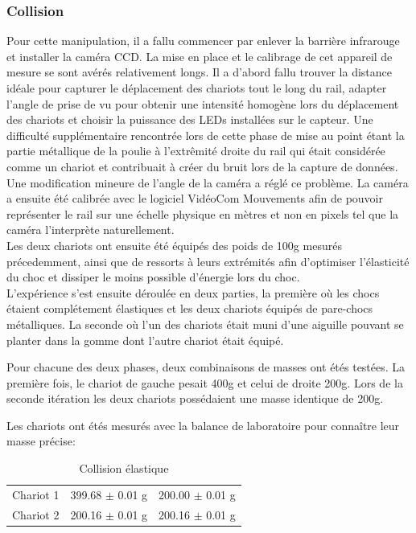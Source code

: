 \subsubsection{Collision}
Pour cette manipulation, il a fallu commencer par enlever la barrière infrarouge et installer la caméra CCD.
La mise en place et le calibrage de cet appareil de mesure se sont avérés relativement longs. Il a d'abord fallu trouver la distance idéale pour capturer le déplacement des chariots tout le long du rail, adapter l'angle de prise de vu pour obtenir une intensité homogène lors du déplacement des chariots et choisir la puissance des LEDs installées sur le capteur. Une difficulté supplémentaire rencontrée lors de cette phase de mise au point étant la partie métallique de la poulie à l'extrêmité droite du rail qui était considérée comme un chariot et contribuait à créer du bruit lors de la capture de données. Une modification mineure de l'angle de la caméra a réglé ce problème.
La caméra a ensuite été calibrée avec le logiciel VidéoCom Mouvements afin de pouvoir représenter le rail sur une échelle physique en mètres et non en pixels tel que la caméra l'interprète naturellement.\\
Les deux chariots ont ensuite été équipés des poids de 100g mesurés précedemment, ainsi que de ressorts à leurs extrémités afin d'optimiser l'élasticité du choc et dissiper le moins possible d'énergie lors du choc. \\

L'expérience s'est ensuite déroulée en deux parties, la première où les chocs étaient complétement élastiques et les deux chariots équipés de pare-chocs métalliques. La seconde où l'un des chariots était muni d'une aiguille pouvant se planter dans la gomme dont l'autre chariot était équipé.

Pour chacune des deux phases, deux combinaisons de masses ont étés testées. La première fois, le chariot de gauche pesait 400g et celui de droite 200g. Lors de la seconde itération les deux chariots possédaient une masse identique de 200g.

Les chariots ont étés mesurés avec la balance de laboratoire pour connaître leur masse précise:
\begin{table}[h]
    \centering
    \caption{Collision élastique}
    \begin{tabular}{|l|l|l|}
	\hline
	Chariot 1 & 399.68 $\pm$ 0.01 g & 200.00 $\pm$ 0.01 g \\
	Chariot 2 & 200.16 $\pm$ 0.01 g & 200.16 $\pm$ 0.01 g \\
	\hline
    \end{tabular}
\end{table}

